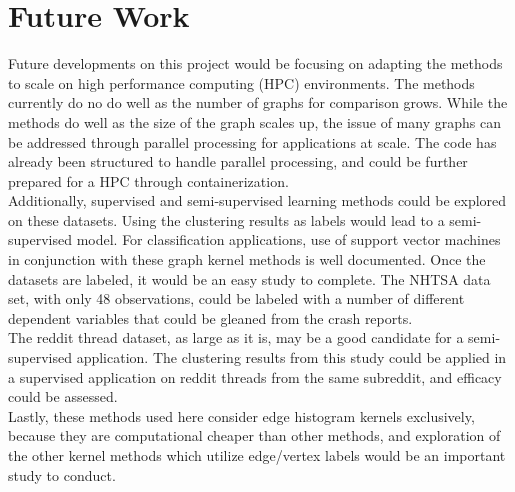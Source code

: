 %
%
%

\chapter{Future Work}

Future developments on this project would be focusing on adapting the methods to scale on high performance computing (HPC) environments. The methods currently do no do well as the number of graphs for comparison grows. While the methods do well as the size of the graph scales up, the issue of many graphs can be addressed through parallel processing for applications at scale. The code has already been structured to handle parallel processing, and could be further prepared for a HPC through containerization.\\
Additionally, supervised and semi-supervised learning methods could be explored on these datasets. Using the clustering results as labels would lead to a semi-supervised model. For classification applications, use of support vector machines in conjunction with these graph kernel methods is well documented. Once the datasets are labeled, it would be an easy study to complete. The NHTSA data set, with only 48 observations, could be labeled with a number of different dependent variables that could be gleaned from the crash reports.\\
The reddit thread dataset, as large as it is, may be a good candidate for a semi-supervised application. The clustering results from this study could be applied in a supervised application on reddit threads from the same subreddit, and efficacy could be assessed.\\
Lastly, these methods used here consider edge histogram kernels exclusively, because they are computational cheaper than other methods, and exploration of the other kernel methods which utilize edge/vertex labels would be an important study to conduct. 
